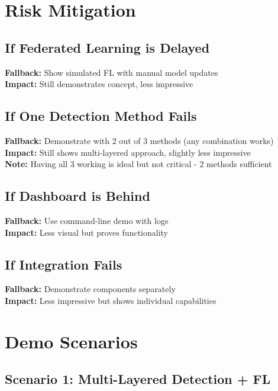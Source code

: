 \documentclass[11pt,a4paper]{article}
\begin{document}
\section{Risk Mitigation}

\subsection{If Federated Learning is Delayed}

\textbf{Fallback:} Show simulated FL with manual model updates \\
\textbf{Impact:} Still demonstrates concept, less impressive

\subsection{If One Detection Method Fails}

\textbf{Fallback:} Demonstrate with 2 out of 3 methods (any combination works) \\
\textbf{Impact:} Still shows multi-layered approach, slightly less impressive \\
\textbf{Note:} Having all 3 working is ideal but not critical - 2 methods sufficient

\subsection{If Dashboard is Behind}

\textbf{Fallback:} Use command-line demo with logs \\
\textbf{Impact:} Less visual but proves functionality

\subsection{If Integration Fails}

\textbf{Fallback:} Demonstrate components separately \\
\textbf{Impact:} Less impressive but shows individual capabilities


\section{Demo Scenarios}

\subsection{Scenario 1: Multi-Layered Detection + FL}
\end{document}
